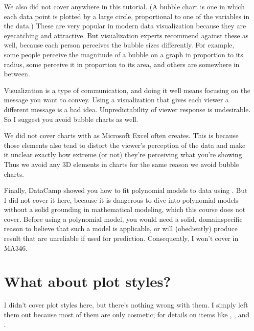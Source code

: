 \documentclass[letterpaper,10pt,english]{jupyterBook}
\begin{document}
\sphinxAtStartPar
We also did not cover  anywhere in this tutorial.  (A bubble chart is one in which each data point is plotted by a large circle, proportional to one of the variables in the data.)  These are very popular in modern data visualization because they are eye\sphinxhyphen{}catching and attractive.  But visualization experts recommend against these as well, because each person perceives the bubble sizes differently.  For example, some people perceive the magnitude of a bubble on a graph in proportion to its radius, some perceive it in proportion to its area, and others are somewhere in between.

\sphinxAtStartPar
Visualization is a type of communication, and doing it well means focusing on the message you want to convey.  Using a visualization that gives each viewer a different message is a bad idea.  Unpredictability of viewer response is undesirable.  So I suggest you avoid bubble charts as well.

\sphinxAtStartPar
We did not cover charts with  as Microsoft Excel often creates.  This is because those elements also tend to distort the viewer’s perception of the data and make it unclear exactly how extreme (or not) they’re perceiving what you’re showing.  Thus we avoid any 3D elements in charts for the same reason we avoid bubble charts.

\sphinxAtStartPar
Finally, DataCamp showed you how to fit polynomial models to data using .  But I did not cover it here, because it is dangerous to dive into polynomial models without a solid grounding in mathematical modeling, which this course does not cover.  Before using a polynomial model, you would need a solid, domain\sphinxhyphen{}specific reason to believe that such a model is applicable, or  will (obediently) produce result that are unreliable if used for prediction.  Consequently, I won’t cover  in MA346.


\section{What about plot styles?}
\label{\detokenize{chapter-10-visualization:what-about-plot-styles}}
\sphinxAtStartPar
I didn’t cover plot styles here, but there’s nothing wrong with them.  I simply left them out because most of them are only cosmetic;  for details on items like , , and .
\end{document}

